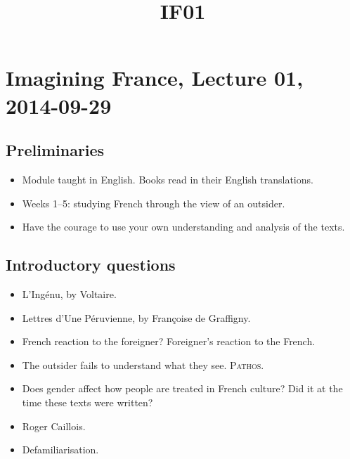 \documentclass[12pt]{article}
\title{IF01}
\begin{document}
\section*{Imagining France, Lecture 01, 2014-09-29}

\subsection*{Preliminaries}

\begin{itemize}
  \item{Module taught in English. Books read in their English translations.}
  \item{Weeks 1--5: studying French through the view of an outsider.}
  \item{Have the courage to use your own understanding and analysis of the texts.}
\end{itemize}

\subsection*{Introductory questions}

\begin{itemize}
  \item{L'Ingénu, by Voltaire.}
  \item{Lettres d'Une Péruvienne, by Françoise de Graffigny.}
  \item{French reaction to the foreigner? Foreigner's reaction to the French.}
  \item{The outsider fails to understand what they see. \textsc{Pathos}.}
  \item{Does gender affect how people are treated in French culture? Did it at the time these texts were written?}
  \item{Roger Caillois.}
  \item{Defamiliarisation.}
\end{itemize}
\end{document}
